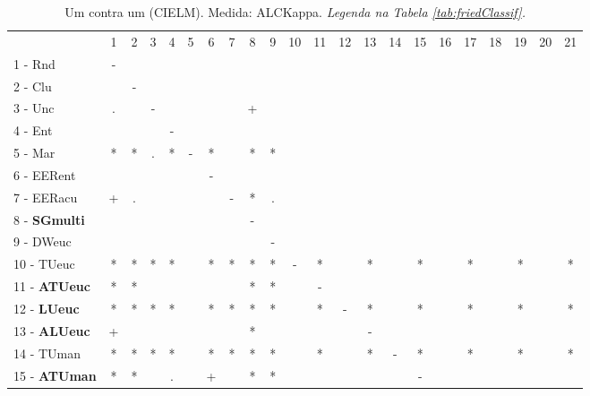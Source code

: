 \begin{table}[h]
\caption{Um contra um (CIELM). Medida: ALCKappa. \textit{Legenda na Tabela \ref{tab:friedClassif}.}}
\begin{center}\begin{tabular}{lcc|cc|cc|cc|cc|cc|cc|cc|cc|cc|c}
 			& 1 & 2 & 3 & 4 & 5 & 6 & 7 & 8 & 9 & 10 & 11 & 12 & 13 & 14 & 15 & 16 & 17 & 18 & 19 & 20 & 21\\
1 - Rnd  	& - &   &   &   &   &   &   &   &   &   &   &   &   &   &   &   &   &   &   &   &   \\
2 - Clu  	&   & - &   &   &   &   &   &   &   &   &   &   &   &   &   &   &   &   &   &   &   \\ \hline
3 - Unc  	& . &   & - &   &   &   &   & + &   &   &   &   &   &   &   &   &   &   &   &   &   \\
4 - Ent  	&   &   &   & - &   &   &   &   &   &   &   &   &   &   &   &   &   &   &   &   &   \\ \hline
5 - Mar  	& * & * & . & * & - & * &   & * & * &   &   &   &   &   &   &   &   &   &   &   &   \\
6 - EERent	&   &   &   &   &   & - &   &   &   &   &   &   &   &   &   &   &   &   &   &   &   \\ \hline
7 - EERacu	& + & . &   &   &   &   & - & * & . &   &   &   &   &   &   &   &   &   &   &   &   \\
8 - \textbf{SGmulti}	&   &   &   &   &   &   &   & - &   &   &   &   &   &   &   &   &   &   &   &   &   \\ \hline
9 - DWeuc	&   &   &   &   &   &   &   &   & - &   &   &   &   &   &   &   &   &   &   &   &   \\
10 - TUeuc	& * & * & * & * &   & * & * & * & * & - & * &   & * &   & * &   & * &   & * &   & * \\ \hline
11 - \textbf{ATUeuc}	& * & * &   &   &   &   &   & * & * &   & - &   &   &   &   &   &   &   &   &   &   \\
12 - \textbf{LUeuc}	& * & * & * & * &   & * & * & * & * &   & * & - & * &   & * &   & * &   & * &   & * \\ \hline
13 - \textbf{ALUeuc}	& + &   &   &   &   &   &   & * &   &   &   &   & - &   &   &   &   &   &   &   &   \\
14 - TUman	& * & * & * & * &   & * & * & * & * &   & * &   & * & - & * &   & * &   & * &   & * \\ \hline
15 - \textbf{ATUman}	& * & * &   & . &   & + &   & * & * &   &   &   &   &   & - &   &   &   &   &   &   \\

\end{tabular}
\end{center}
\end{table}
